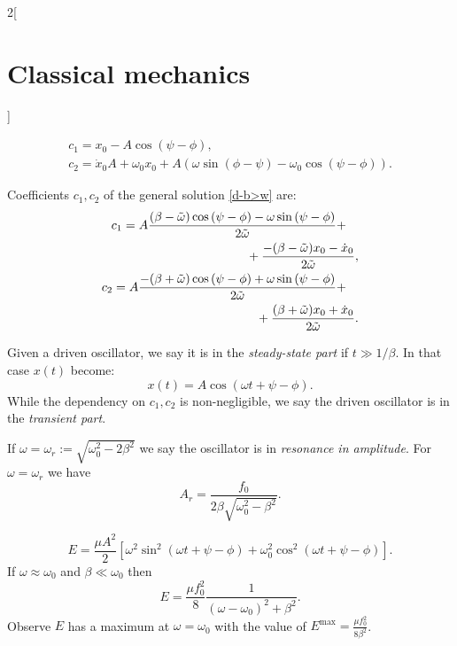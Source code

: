 \documentclass[class=article,10pt,crop=false]{standalone}
\begin{document}
\begin{multicols}{2}[\section{Classical mechanics}]
\begin{concept}
\begin{gather*}
    c_1=x_0-A\cos\left(\psi-\phi\right),\\
	c_2=\dot{x}_0A+\omega_0x_0+A\left(\omega\sin\left(\phi-\psi\right)-\omega_0\cos\left(\psi-\phi\right)\right).
\end{gather*}
\end{concept}
\begin{concept}
Coefficients $c_1,c_2$ of the general solution \ref{d-b>w} are:
\begin{equation*}
    \begin{split}
        \begin{multlined}[t]
        c_1=A\frac{(\beta-\Tilde{\omega})\cos\left(\psi-\phi\right)-\omega\sin\left(\psi-\phi\right)}{2\Tilde{\omega}}+\\+\frac{-(\beta-\Tilde{\omega})x_0-\dot{x}_0}{2\Tilde{\omega}},
        \end{multlined}\\
        \begin{multlined}[t]
        c_2=A\frac{-(\beta+\Tilde{\omega})\cos\left(\psi-\phi\right)+\omega\sin\left(\psi-\phi\right)}{2\Tilde{\omega}}+\\+\frac{(\beta+\Tilde{\omega})x_0+\dot{x}_0}{2\Tilde{\omega}}.
        \end{multlined}
    \end{split}
\end{equation*}
\end{concept}
\begin{definition}
Given a driven oscillator, we say it is in the \textit{steady-state part} if $t\gg 1/\beta$. In that case $x(t)$ become: $$x(t)=A\cos(\omega t+\psi-\phi).$$ While the dependency on $c_1,c_2$ is non-negligible, we say the driven oscillator is in the \textit{transient part}.
\end{definition}
\begin{concept}
If $\omega=\omega_r:=\sqrt{\omega_0^2-2\beta^2}$ we say the oscillator is in \textit{resonance in amplitude}. For $\omega=\omega_r$ we have $$A_r=\frac{f_0}{2\beta\sqrt{\omega_0^2-\beta^2}}.$$
\end{concept}
\begin{concept}
$$E=\frac{\mu A^2}{2}\left[\omega^2\sin^2(\omega t+\psi-\phi)+\omega_0^2\cos^2(\omega t+\psi-\phi)\right].$$ If $\omega\approx\omega_0$ and $\beta\ll\omega_0$ then $$E=\frac{\mu f_0^2}{8}\frac{1}{(\omega-\omega_0)^2+\beta^2}.$$ Observe $E$ has a maximum at $\omega=\omega_0$ with the value of $E^\text{max}=\frac{\mu f_0^2}{8\beta^2}$.

\end{concept}
\end{multicols}
\end{document}

